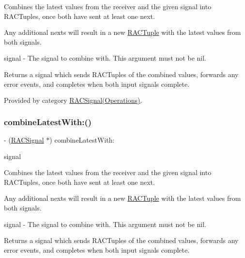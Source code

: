 Combines the latest values from the receiver and the given signal into R\+A\+C\+Tuples, once both have sent at least one {\ttfamily next}.

Any additional {\ttfamily next}s will result in a new \mbox{\hyperlink{interface_r_a_c_tuple}{R\+A\+C\+Tuple}} with the latest values from both signals.

signal -\/ The signal to combine with. This argument must not be nil.

Returns a signal which sends R\+A\+C\+Tuples of the combined values, forwards any {\ttfamily error} events, and completes when both input signals complete. 

Provided by category \mbox{\hyperlink{category_r_a_c_signal_07_operations_08_afab1b19558df566351cf87e466a5022f}{R\+A\+C\+Signal(\+Operations)}}.

\mbox{\label{interface_r_a_c_signal_afab1b19558df566351cf87e466a5022f}} 
\subsubsection{\texorpdfstring{combine\+Latest\+With\+:()}{combineLatestWith:()}\hspace{0.1cm}{\footnotesize\ttfamily [3/3]}}
{\footnotesize\ttfamily -\/ (\mbox{\hyperlink{interface_r_a_c_signal}{R\+A\+C\+Signal}} $\ast$) combine\+Latest\+With\+: \begin{DoxyParamCaption}\item[{(\mbox{\hyperlink{interface_r_a_c_signal}{R\+A\+C\+Signal}} $\ast$)}]{signal }\end{DoxyParamCaption}}

Combines the latest values from the receiver and the given signal into R\+A\+C\+Tuples, once both have sent at least one {\ttfamily next}.

Any additional {\ttfamily next}s will result in a new \mbox{\hyperlink{interface_r_a_c_tuple}{R\+A\+C\+Tuple}} with the latest values from both signals.

signal -\/ The signal to combine with. This argument must not be nil.

Returns a signal which sends R\+A\+C\+Tuples of the combined values, forwards any {\ttfamily error} events, and completes when both input signals complete. 


